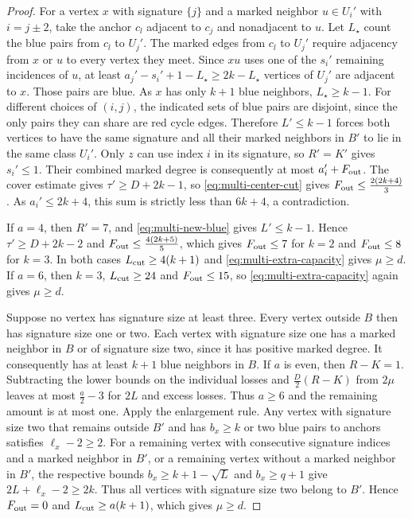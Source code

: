 \documentclass[preprint,11pt,numbers]{elsarticle-arxiv}
\numberwithin{equation}{section}
\theoremstyle{definition}
\begin{document}
\begin{proof}
For a vertex $x$ with signature $\{j\}$ and a marked neighbor
$u\in U_i'$ with $i=j\pm2$, take the anchor $c_l$ adjacent to
$c_j$ and nonadjacent to $u$. Let $L_{\star}$ count the blue
pairs from $c_l$ to $U_j'$. The marked edges from $c_l$ to
$U_j'$ require adjacency from $x$ or $u$ to every vertex they
meet. Since $xu$ uses one of the $s_i'$ remaining incidences
of $u$, at least $a_j'-s_i'+1-L_{\star}\ge2k-L_{\star}$
vertices of $U_j'$ are adjacent to $x$. Those pairs are blue.
As $x$ has only $k+1$ blue neighbors, $L_{\star}\ge k-1$.
For different choices of $(i,j)$, the indicated sets of blue
pairs are disjoint, since the only pairs they can share are
red cycle edges. Therefore $L'\le k-1$ forces both vertices to
have the same signature and all their marked neighbors in
$B'$ to lie in the same class $U_i'$. Only $z$ can use index
$i$ in its signature, so $R'=K'$ gives $s_i'\le1$. Their
combined marked degree is consequently at most $a_i'+F_{\rm out}$.
The cover estimate gives
$\tau'\ge D+2k-1$, so \eqref{eq:multi-center-cut} gives
$F_{\rm out}\le\frac{2(2k+4)}{3}$. As $a_i'\le2k+4$, this sum is
strictly less than $6k+4$, a contradiction.

If $a=4$, then $R'=7$, and \eqref{eq:multi-new-blue} gives
$L'\le k-1$. Hence $\tau'\ge D+2k-2$ and
$F_{\rm out}\le\frac{4(2k+5)}{5}$, which gives $F_{\rm out}\le7$ for $k=2$ and
$F_{\rm out}\le8$ for $k=3$. In both cases $L_{\rm cut}\ge4(k+1)$
and \eqref{eq:multi-extra-capacity} gives $\mu\ge d$.
If $a=6$, then $k=3$, $L_{\rm cut}\ge24$ and $F_{\rm out}\le15$,
so \eqref{eq:multi-extra-capacity} again gives $\mu\ge d$.

Suppose no vertex has signature size at least three. Every
vertex outside $B$ then has signature size one or two. Each
vertex with signature size one has a marked neighbor in $B$
or of signature size two, since it has positive marked degree.
It consequently has at least $k+1$ blue neighbors in $B$.
If $a$ is even, then $R-K=1$. Subtracting the lower bounds
on the individual losses and $\frac{D}{2}(R-K)$ from $2\mu$
leaves at most $\frac{a}{2}-3$ for $2L$ and excess losses.
Thus $a\ge6$ and the remaining amount is at most one.
Apply the enlargement rule. Any vertex with signature size
two that remains outside $B'$ and has $b_x\ge k$ or two blue
pairs to anchors satisfies $\ell_x-2\ge2$. For a remaining
vertex with consecutive signature indices and a marked neighbor
in $B'$, or a remaining vertex without a marked neighbor in
$B'$, the respective bounds $b_x\ge k+1-\sqrt L$ and
$b_x\ge q+1$ give $2L+\ell_x-2\ge2k$. Thus all vertices with
signature size two belong to $B'$. Hence $F_{\rm out}=0$
and $L_{\rm cut}\ge a(k+1)$, which gives $\mu\ge d$.


\end{proof}
\end{document}
